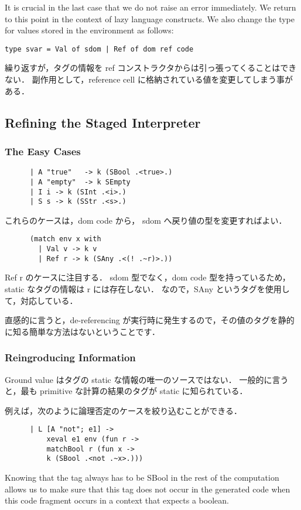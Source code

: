 \documentclass[10pt,a4paper]{jarticle}
\theoremstyle{definition}
\begin{document}
It is crucial in the last case that we do not raise an error immediately. We return to this point in the context of lazy language constructs.
We also change the type for values stored in the environment as follows:

{\small
\begin{verbatim}
type svar = Val of sdom | Ref of dom ref code
\end{verbatim}}
繰り返すが，タグの情報を ref コンストラクタからは引っ張ってくることはできない．
副作用として，reference cell に格納されている値を変更してしまう事がある．


\subsection{Refining the Staged Interpreter}
\subsubsection{The Easy Cases}
{\small
\begin{verbatim}
      | A "true"   -> k (SBool .<true>.)
      | A "empty"  -> k SEmpty
      | I i -> k (SInt .<i>.)
      | S s -> k (SStr .<s>.)
\end{verbatim}}
これらのケースは，dom code から， sdom へ戻り値の型を変更すればよい．

{\small
\begin{verbatim}
	  (match env x with
	    | Val v -> k v
	    | Ref r -> k (SAny .<(! .~r)>.))
\end{verbatim}}
Ref r のケースに注目する．
sdom 型でなく，dom code 型を持っているため，static なタグの情報は r には存在しない．
なので，SAny というタグを使用して，対応している．

直感的に言うと，de-referencing が実行時に発生するので，その値のタグを静的に知る簡単な方法はないということです．

\subsubsection{Reingroducing Information}
Ground value はタグの static な情報の唯一のソースではない．
一般的に言うと，最も primitive な計算の結果のタグが static に知られている．

例えば，次のように論理否定のケースを絞り込むことができる．
{\small
\begin{verbatim}
      | L [A "not"; e1] ->
          xeval e1 env (fun r ->
          matchBool r (fun x ->
          k (SBool .<not .~x>.)))
\end{verbatim}}
Knowing that the tag always has to be SBool in the rest of the computation allows us to make sure that this tag does not occur in the generated code when this code fragment occurs in a context that expects a boolean.
\end{document}
